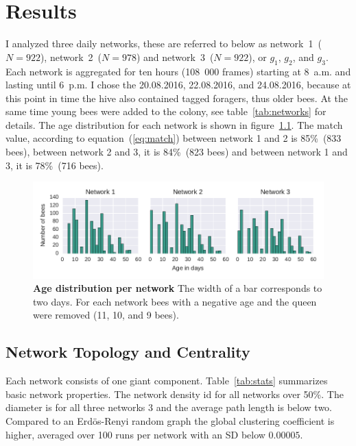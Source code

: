 \chapter{Results}
\label{ch:results}

I analyzed three daily networks, these are referred to below as network~1~($N=922$), network~2~($N=978$) and network~3~($N=922$), or $g_1$, $g_2$, and $g_3$. Each network is aggregated for ten hours (108~000 frames) starting at 8~a.m. and lasting until 6~p.m. I chose the 20.08.2016, 22.08.2016, and 24.08.2016, because at this point in time the hive also contained tagged foragers, thus older bees. At the same time young bees were added to the colony, see table~\ref{tab:networks} for details. The age distribution for each network is shown in figure~\ref{fig:ages}. The match value, according to equation~(\ref{eq:match}) between network 1 and 2 is 85\%~(833 bees), between network 2 and 3, it is 84\%~(823 bees) and between network 1 and 3, it is 78\%~(716 bees).




\begin{figure}[htb]
	\centering
	\includegraphics[width=1.0\textwidth]{Figures/ages}
	\caption[Age distribution per network]{\textbf{Age distribution per network} The width of a bar corresponds to two days. For each network bees with a negative age and the queen were removed (11, 10, and 9 bees).}
	\label{fig:ages}
\end{figure}


\section{Network Topology and Centrality}

Each network consists of one giant component. Table~\ref{tab:stats} summarizes basic network properties. The network density id for all networks over 50\%. The diameter is for all three networks $3$ and the average path length is below two. Compared to an Erdös-Renyi random graph the global clustering coefficient is higher, averaged over 100 runs per network with an SD below $0.00005$.

